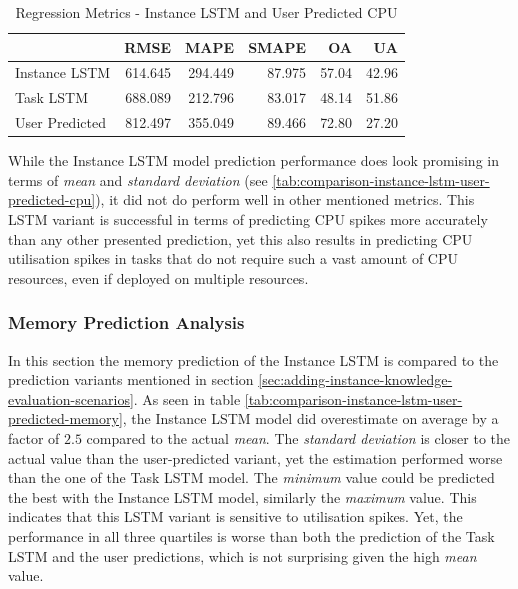       \begin{table}
        \centering
        \caption{Regression Metrics - Instance LSTM and User Predicted CPU}
        \label{tab:regression-metrics-instance-lstm-user-predicted-cpu}

        \begin{tabular}{|l|rrrrr|}
          \toprule
          {} &     RMSE &     MAPE &   SMAPE &     OA &     UA \\
          \midrule
          Instance LSTM   &  614.645 &  294.449 &  87.975 &  57.04 &  42.96 \\
          Task LSTM   &  688.089 &  212.796 &  83.017 &  48.14 &  51.86 \\
          User Predicted &  812.497 &  355.049 &  89.466 &  72.80 &  27.20 \\
          \bottomrule
        \end{tabular}
      \end{table}
      While the Instance LSTM model prediction performance does look promising in terms of \emph{mean} and \emph{standard deviation} (see \ref{tab:comparison-instance-lstm-user-predicted-cpu}), it did not do perform well in other mentioned metrics.
      This LSTM variant is successful in terms of predicting CPU spikes more accurately than any other presented prediction, yet this also results in predicting CPU utilisation spikes in tasks that do not require such a vast amount of CPU resources, even if deployed on multiple resources.

    \subsubsection{Memory Prediction Analysis}
    \label{sec:mem-prediction-analysis-instance-knowledge-lstm-evaluation-scenarios}

      In this section the memory prediction of the Instance LSTM is compared to the prediction variants mentioned in section \ref{sec:adding-instance-knowledge-evaluation-scenarios}.
      As seen in table \ref{tab:comparison-instance-lstm-user-predicted-memory}, the Instance LSTM model did overestimate on average by a factor of $2.5$ compared to the actual \emph{mean}.
      The \emph{standard deviation} is closer to the actual value than the user-predicted variant, yet the estimation performed worse than the one of the Task LSTM model.
      The \emph{minimum} value could be predicted the best with the Instance LSTM model, similarly the \emph{maximum} value. 
      This indicates that this LSTM variant is sensitive to utilisation spikes.
      Yet, the performance in all three quartiles is worse than both the prediction of the Task LSTM and the user predictions, which is not surprising given the high \emph{mean} value.

